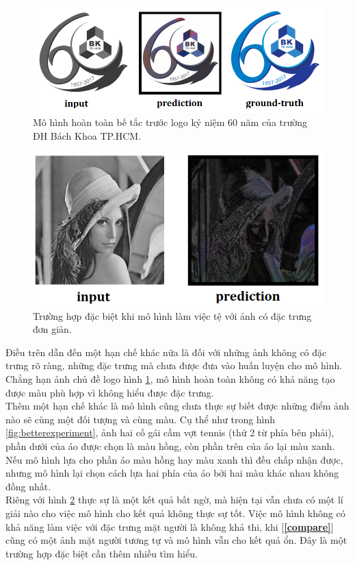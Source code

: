 \documentclass[a4paper, 12pt]{article}
\begin{document}
\begin{figure}[!h]
\captionsetup{width=0.8\textwidth}
\centering
\includegraphics[width=15cm]{images/4_12.PNG}
\caption{Mô hình hoàn toàn bế tắc trước logo kỷ niệm 60 năm của trường ĐH Bách Khoa TP.HCM.}
\label{fig:failcolorlogo}
\end{figure}

\begin{figure}[!h]
\captionsetup{width=0.8\textwidth}
\centering
\includegraphics[width=12cm]{images/4_13.png}
\caption{Trường hợp đặc biệt khi mô hình làm việc tệ với ảnh có đặc trưng đơn giản.}
\label{fig:edgecase}
\end{figure}

\noindent
Điều trên dẫn đến một hạn chế khác nữa là đối với những ảnh không có đặc trưng rõ ràng, những đặc trưng mà chưa được đưa vào huấn luyện cho mô hình. Chẳng hạn ảnh chủ đề logo hình \ref{fig:failcolorlogo}, mô hình hoàn toàn không có khả năng tạo được màu phù hợp vì không hiểu được đặc trưng.\vspace{5pt}\\
Thêm một hạn chế khác là mô hình cũng chưa thực sự biết được những điểm ảnh nào sẽ cùng một đối tượng và cùng màu. Cụ thể như trong hình \ref{fig:betterexperiment}, ảnh hai cố gái cầm vợt tennis (thứ 2 từ phía bên phải), phần dưới của áo được chọn là màu hồng, còn phần trên của áo lại màu xanh. Nếu mô hình lựa cho phần áo màu hồng hay màu xanh thì đều chấp nhận được, nhưng mô hình lại chọn cách lựa hai phía của áo bởi hai màu khác nhau không đồng nhất.\vspace{5pt}\\
Riêng với hình \ref{fig:edgecase} thực sự là một kết quả bất ngờ, mà hiện tại vẫn chưa có một lí giải nào cho việc mô hình cho kết quả không thực sự tốt. Việc mô hình không có khả năng làm việc với đặc trưng mặt người là không khả thi, khi [\textbf{\ref{compare}}] cũng có một ảnh mặt người tương tự và mô hình vẫn cho kết quả ổn. Đây là một trường hợp đặc biệt cần thêm nhiều tìm hiểu.
\end{document}
